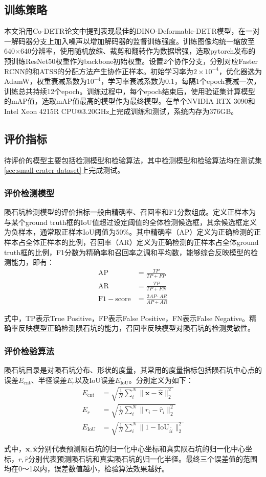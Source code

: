 \subsection{训练策略}
本文沿用Co-DETR\cite{zongDETRsCollaborativeHybrid2023}论文中提到表现最佳的DINO-Deformable-DETR模型，在一对一解码器分支上加入噪声以增加解码器的监督训练强度。训练图像均统一缩放至640$\times$640分辨率，使用随机放缩、裁剪和翻转作为数据增强，选取pytorch发布的预训练ResNet50权重作为backbone初始权重。设置2个协作分支，分别对应Faster RCNN\cite{renFasterRCNNRealtime2015}的和ATSS\cite{zhangBridgingGapAnchorbased2020}的分配方法产生协作正样本。初始学习率为$2\times10^{-4}$，优化器选为AdamW，权重衰减系数为$10^{-4}$，学习率衰减系数为0.1，每隔1个epoch衰减一次，训练总共持续12个epoch。训练过程中，每个epoch结束后，使用验证集计算模型的mAP值，选取mAP值最高的模型作为最终模型。在单个NVIDIA RTX 3090和Intel Xeon 4215R CPU@3.20GHz上完成训练和测试，系统内存为376GB。
\subsection{评价指标}
待评价的模型主要包括检测模型和检验算法，其中检测模型和检验算法均在测试集\ref{sec:small crater dataset}上完成测试。
\subsubsection{评价检测模型}
陨石坑检测模型的评价指标一般由精确率、召回率和F1分数组成。定义正样本为与某个ground truth框的IoU值超过设定阈值的全体检测候选框，其余候选框定义为负样本，通常取正样本IoU阈值为50\%。其中精确率（AP）定义为正确检测的正样本占全体正样本的比例，召回率（AR）定义为正确检测的正样本占全体ground truth框的比例，F1分数为精确率和召回率之调和平均数，能够综合反映模型的检测能力，即有：
\begin{align}
  \mathrm{AP}&=\frac{TP}{TP+FP}\\
  \mathrm{AR}&=\frac{TP}{TP+FN}\\
  \mathrm{F1-score}&=\frac{2AP\cdot AR}{AP+AR}
\end{align}\par
式中，TP表示True Positive，FP表示False Positive，FN表示False Negative。精确率反映模型正确检测陨石坑的能力，召回率反映模型对陨石坑的检测灵敏性。
\subsubsection{评价检验算法}
陨石坑目录是对陨石坑分布、形状的度量，其常用的度量指标包括陨石坑中心点的误差$E_\mathrm{cnt}$、半径误差$E_r$以及IoU误差$E_\mathrm{IoU}$。分别定义为如下：
\begin{align}
  E_\mathrm{cnt}&=\sqrt{\frac{1}{N}\sum_i^N\|\mathbf{x}-\hat{\mathbf{x}}\|_2^2}\\
  E_r&=\sqrt{\frac{1}{N}\sum_i^N\|r_i-\hat{r}_i\|_2^2}\\
  E_\mathrm{IoU}&=\sqrt{\frac{1}{N}\sum_i^N\|1-\mathrm{IoU}_{i\hat{i}}\|_2^2}
\end{align}\par
式中，$\mathbf{x},\hat{\mathbf{x}}$分别代表预测陨石坑的归一化中心坐标和真实陨石坑的归一化中心坐标，$r,\hat{r}$分别代表预测陨石坑和真实陨石坑的归一化半径。最终三个误差值的范围均在0～1以内，误差数值越小，检验算法效果越好。
